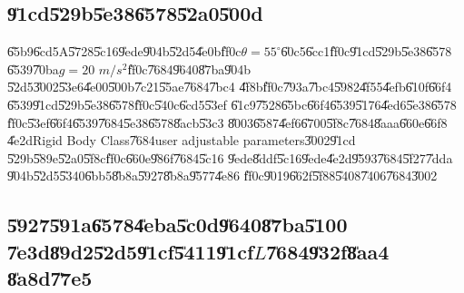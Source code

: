 \subsection{\U{91cd}\U{529b}\U{5e38}\U{6578}\U{52a0}\U{500d}}

\U{65b9}\U{6cd5}A\U{5728}\U{5c16}\U{9ede}\U{904b}\U{52d5}\U{4e0b}\U{ff0c}$%
\theta =55^{\circ }$\U{60c5}\U{6cc1}\U{ff0c}\U{91cd}\U{529b}\U{5e38}\U{6578}%
\U{6539}\U{70ba}$g=20$ $m/s^{2}$\U{ff0c}\U{7684}\U{9640}\U{87ba}\U{904b}%
\U{52d5}\U{3002}\U{53e6}\U{4e00}\U{500b}\U{7c21}\U{55ae}\U{7684}\U{7bc4}%
\U{4f8b}\U{ff0c}\U{793a}\U{7bc4}\U{5982}\U{4f55}\U{4efb}\U{610f}\U{66f4}%
\U{6539}\U{91cd}\U{529b}\U{5e38}\U{6578}\U{ff0c}\U{540c}\U{6cd5}\U{53ef}%
\U{61c9}\U{7528}\U{65bc}\U{66f4}\U{6539}\U{5176}\U{4ed6}\U{5e38}\U{6578}%
\U{ff0c}\U{53ef}\U{66f4}\U{6539}\U{7684}\U{5e38}\U{6578}\U{8acb}\U{53c3}%
\U{8003}\U{6587}\U{4ef6}\U{6700}\U{5f8c}\U{7684}\U{8aaa}\U{660e}\U{66f8}%
\U{4e2d}Rigid Body Class\U{7684}user adjustable parameters\U{3002}\U{91cd}%
\U{529b}\U{589e}\U{52a0}\U{5f8c}\U{ff0c}\U{660e}\U{986f}\U{7684}\U{5c16}%
\U{9ede}\U{8ddf}\U{5c16}\U{9ede}\U{4e2d}\U{9593}\U{7684}\U{5f27}\U{7dda}%
\U{904b}\U{52d5}\U{5340}\U{6bb5}\U{8b8a}\U{5927}\U{8b8a}\U{9577}\U{4e86}%
\U{ff0c}\U{9019}\U{662f}\U{5f88}\U{5408}\U{7406}\U{7684}\U{3002}

\subsection{\U{5927}\U{591a}\U{6578}\U{4eba}\U{5c0d}\U{9640}\U{87ba}\U{5100}%
\U{7e3d}\U{89d2}\U{52d5}\U{91cf}\U{5411}\U{91cf}$L$\U{7684}\U{932f}\U{8aa4}%
\U{8a8d}\U{77e5}}

